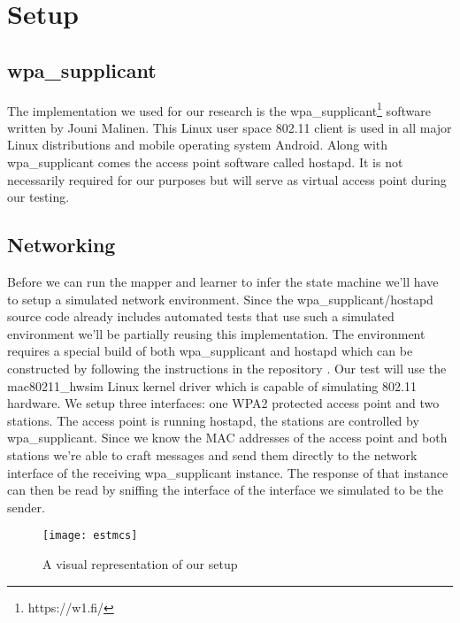 \section{Setup}

\subsection{wpa\_supplicant}

The implementation we used for our research is the wpa\_supplicant\footnote{https://w1.fi/} software written by Jouni Malinen. This Linux user space 802.11 client is used in all major Linux distributions and mobile operating system Android.
Along with wpa\_supplicant comes the access point software called hostapd. It is not necessarily required for our purposes but will serve as virtual access point during our testing.

\subsection{Networking}

Before we can run the mapper and learner to infer the state machine we'll have to setup a simulated network environment. Since the wpa\_supplicant/hostapd source code already includes automated tests that use such a simulated environment we'll be partially reusing this implementation.
The environment requires a special build of both wpa\_supplicant and hostapd which can be constructed by following the instructions in the repository \cite{Malinen:2013}.
Our test will use the mac80211\_hwsim Linux kernel driver which is capable of simulating 802.11 hardware. We setup three interfaces: one WPA2 protected access point and two stations. The access point is running hostapd, the stations are controlled by wpa\_supplicant. Since we know the MAC addresses of the access point and both stations we're able to craft messages and send them directly to the network interface of the receiving wpa\_supplicant instance. The response of that instance can then be read by sniffing the interface of the interface we simulated to be the sender.

\begin{figure}[!h]
	\centering
	\texttt{[image: estmcs]}
	\caption{A visual representation of our setup}
	\label{fig:setup}
\end{figure}